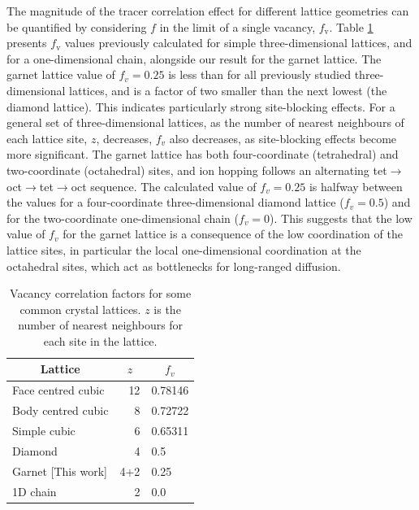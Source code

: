 \documentclass[aps,prb,twocolumn,superscriptaddress,reprint]{revtex4-1}
\newcommand{\m}[1]{\mathrm{#1}}
\begin{document}
The magnitude of the tracer correlation effect for different lattice geometries can be quantified by considering $f$ in the limit of a single vacancy, $f_\m{v}$. 
Table \ref{tab:vacancy_correlation_factors} presents $f_\m{v}$ values previously calculated for simple three-dimensional lattices,\cite{CompaanAndHaven_TransFaradaySoc1956} and for a one-dimensional chain,\cite{Mehrer_DiffusionBook} alongside our result for the garnet lattice. 
The garnet lattice value of $f_v=0.25$ is less than for all previously studied three-dimensional lattices, and is a factor of two smaller than the next lowest (the diamond lattice). This indicates particularly strong site-blocking effects.  
For a general set of three-dimensional lattices, as the number of nearest neighbours of each lattice site, $z$, decreases, $f_v$ also decreases, as site-blocking effects become more significant.\cite{Friauf_JApplPhys1962}
The garnet lattice has both four-coordinate (tetrahedral) and two-coordinate (octahedral) sites, and ion hopping follows an alternating tet$\to$oct$\to$tet$\to$oct sequence. 
The calculated value of $f_v=0.25$ is halfway between the values for a four-coordinate three-dimensional diamond lattice ($f_v=0.5$) and for the two-coordinate one-dimensional chain ($f_v=0$).\cite{Mehrer_DiffusionBook} 
This suggests that the low value of $f_v$ for the garnet lattice is a consequence of the low coordination of the lattice sites, in particular the local one-dimensional coordination at the octahedral sites, which act as bottlenecks for long-ranged diffusion. 

\begin{table}[htb]
   \begin{center}
     \begin{tabular}{lrl} \hline
        \multicolumn{1}{c}{Lattice} & \multicolumn{1}{c}{$z$} & \multicolumn{1}{c}{$f_v$} \\ \hline
        Face centred cubic\cite{CompaanAndHaven_TransFaradaySoc1956} & 12 & 0.78146 \\
        Body centred cubic\cite{CompaanAndHaven_TransFaradaySoc1956} & 8 & 0.72722 \\
        Simple cubic\cite{CompaanAndHaven_TransFaradaySoc1956} & 6 & 0.65311 \\
        Diamond\cite{CompaanAndHaven_TransFaradaySoc1956} & 4 & 0.5 \\
        Garnet [This work] & 4+2 & 0.25 \\ 
        1D chain\cite{Mehrer_DiffusionBook} & 2 & 0.0 \\ \hline
     \end{tabular}
   \caption{\label{tab:vacancy_correlation_factors}Vacancy correlation factors for some common crystal lattices. $z$ is the number of nearest neighbours for each site in the lattice.}
   \end{center}
 \end{table}
\end{document}
